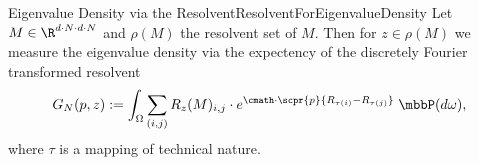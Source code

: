 \begin{mpos}{Eigenvalue Density via the Resolvent}{ResolventForEigenvalueDensity}
    Let $M\in\R^{d\cdot N\cdot d\cdot N}$ and $\rho(M)$ the resolvent set of $M$. Then for $z\in\rho(M)$ we measure the eigenvalue density via the expectency of the discretely Fourier transformed resolvent
    \[
        G_N(p,z) := \int_{\Omega}
            \sum_{(i,j)}R_z(M)_{i,j}\cdot e^{\cmath\cdot\scpr{p}{R_{\tau(i)} - R_{\tau(j)}}}
        \;\mbbP(d\omega),
    \]
    where $\tau$ is a mapping of technical nature.
\end{mpos}